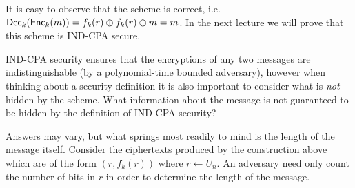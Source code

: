 \documentclass[11pt]{article}
\begin{document}
It is easy to observe that the scheme is correct,
i.e. $\mathsf{Dec}_k(\mathsf{Enc}_k (m)) = f_k(r) \oplus f_k(r) \oplus m =
m$. In the next lecture we will prove that this scheme is IND-CPA
secure.

\begin{question}
    IND-CPA security ensures that the encryptions of any two messages are
    indistinguishable (by a polynomial-time bounded adversary), however when thinking
    about a security definition it is also important to consider what is \emph{not}
    hidden by the scheme. What information about the message is not guaranteed to be
    hidden by the definition of IND-CPA security?
\end{question}
\begin{answer}
    Answers may vary, but what springs most readily to mind is the length of the message
    itself. Consider the ciphertexts produced by the construction above which are of the
    form \((r, f_k(r))\) where \(r \gets U_n\). An adversary need only count the number
    of bits in \(r\) in order to determine the length of the message.
\end{answer}
\end{document}
